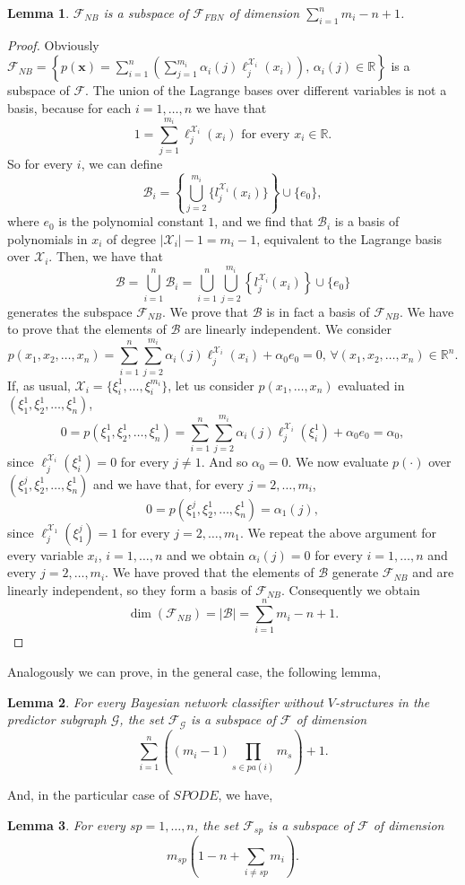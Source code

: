 \documentclass[11pt,a4paper, twoside]{book}
\newtheorem{lemma}{Lemma}[chapter]
\newcommand{\nchi}{\mathcal{X}}
\begin{document}
\begin{lemma}
\label{lem:nbsubspace}
$ \mathcal{F}_{NB}$ is a subspace of $\mathcal{F}_{FBN}$ of dimension $\sum_{i=1}^n m_i -n +1$.
\end{lemma}
\begin{proof}
Obviously $ \mathcal{F}_{NB} = \left\{ p(\mathbf{x})=\sum_{i=1}^n \left( \sum_{j=1}^{m_i}  \alpha_{i}(j)\ell ^{\nchi_i} _j(x_i) \right)\text{, } \alpha_{i}(j) \in \mathbb{R}  \right\}$ is a subspace of $\mathcal{F}$. The union of the Lagrange bases over different variables is not a basis, because for each $i=1,\ldots,n$ we have that
\[ 1=\sum_{j=1}^{m_i} \ell_j^{\nchi_i}(x_i) \text{ for every } x_i \in \mathbb{R} . \]
So for every $i$, we can define
\[ \mathcal{B}_i=\left\{ \bigcup_{j=2}^{m_i}\{l_j^{\nchi_i}(x_i)\} \right\} \cup \{ e_0 \} ,\]
where $e_0$ is the polynomial constant $1$, and we find that $\mathcal{B}_i$ is a basis of polynomials in $x_i$ of degree $|\nchi_i|-1=m_i-1$, equivalent to the Lagrange basis over $\nchi_i$.
Then, we have that
\[ \mathcal{B}=\bigcup_{i=1}^n \mathcal{B}_i = \bigcup_{i=1}^n \bigcup_{j=2}^{m_i}\left\{l_j^{\nchi_i}(x_i)\right\}\cup \{ e_0 \} \]
generates the subspace $\mathcal{F}_{NB}$. We prove that $\mathcal{B}$ is in fact a basis of $ \mathcal{F}_{NB}$. We have to prove that the elements of $\mathcal{B}$ are linearly independent.
We consider
\[p(x_1,x_2,\ldots,x_n)= \sum_{i=1}^{n} \sum_{j=2}^{m_i} \alpha_i(j) \ell^{\nchi_i}_j(x_i)  + \alpha_0 e_0 =0 \text{, } \forall (x_1,x_2,\ldots,x_n) \in \mathbb{R}^n.\]
If, as usual, $\nchi_i=\{\xi_i^1,\ldots,\xi_i^{m_i}\}$, let us consider $p(x_1,\ldots,x_n)$ evaluated in $(\xi_1^1,\xi_2^1,\ldots,\xi_n^1)$,
\[ 0=p(\xi_1^1,\xi_2^1,\ldots,\xi_n^1)=\sum_{i=1}^{n} \sum_{j=2}^{m_i} \alpha_i(j) \ell^{\nchi_i}_j(\xi_i^1)+\alpha_0e_0=\alpha_0,\]
since $\ell^{\nchi_i}_j(\xi_i^1)=0$ for every $j\neq1$. And so $\alpha_0=0$. We now evaluate $p(\cdot)$ over $(\xi_1^j,\xi_2^1,\ldots,\xi_n^1)$ and we have that, for every $j=2,\ldots,m_i$,
\[0=p(\xi_1^j,\xi_2^1,\ldots,\xi_n^1)=\alpha_1(j),\]
since $\ell_j^{\nchi_1}(\xi_1^j)=1$ for every $j=2,\ldots,m_1$. We repeat the above argument for every variable $x_i$, $i=1,\ldots,n$ and we obtain $\alpha_i(j)=0$ for every $i=1,\ldots,n$ and every $j=2,\ldots,m_i$.
We have proved that the elements of $\mathcal{B}$ generate $\mathcal{F}_{NB}$ and are linearly independent, so they form a basis of $\mathcal{F}_{NB}$.
Consequently we obtain  
\[\dim( \mathcal{F}_{NB})=|\mathcal{B}|=\sum_{i=1}^n m_i -n +1 . \]
\end{proof}
Analogously we can prove, in the general case, the following lemma,
\begin{lemma}
For every Bayesian network classifier without $V$-structures in the predictor subgraph $\mathcal{G}$, the set $\mathcal{F}_{\mathcal{G}}$ is a subspace of $\mathcal{F}$ of dimension 
\[ \sum_{i=1}^n \left( (m_i-1)\prod_{s \in  {pa}(i)} m_s \right)+1. \]
\label{lem:subspace}
\end{lemma}
And, in the particular case of $SPODE$, we have,
\begin{lemma}
\label{lem:spodesubspace}
For every $sp=1,\ldots,n$, the set $ \mathcal{F}_{sp}$ is a subspace of $\mathcal{F}$ of dimension $$m_{sp}\left(1-n+\sum_{i\neq sp}m_i\right).$$
\end{lemma}
\end{document}
